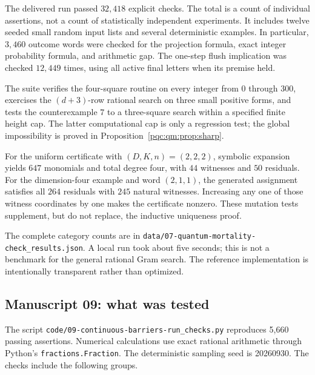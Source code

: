 \documentclass[11pt,letterpaper]{article}
\numberwithin{equation}{section}
\theoremstyle{definition}
\theoremstyle{remark}
\newcommand{\code}[1]{\nolinkurl{#1}}
\begin{document}
The delivered run passed $32{,}418$ explicit checks. The total is a count of individual assertions, not a count of statistically independent experiments. It includes twelve seeded small random input lists and several deterministic examples. In particular, $3{,}460$ outcome words were checked for the projection formula, exact integer probability formula, and arithmetic gap. The one-step flush implication was checked $12{,}449$ times, using all active final letters when its premise held.

The suite verifies the four-square routine on every integer from $0$ through $300$, exercises the $(d+3)$-row rational search on three small positive forms, and tests the counterexample $7$ to a three-square search within a specified finite height cap. The latter computational cap is only a regression test; the global impossibility is proved in Proposition~\ref{pqc:qm:prop:sharp}.

For the uniform certificate with $(D,K,n)=(2,2,2)$, symbolic expansion yields $647$ monomials and total degree four, with $44$ witnesses and $50$ residuals. For the dimension-four example and word $(2,1,1)$, the generated assignment satisfies all $264$ residuals with $245$ natural witnesses. Increasing any one of those witness coordinates by one makes the certificate nonzero. These mutation tests supplement, but do not replace, the inductive uniqueness proof.

The complete category counts are in \code{data/07-quantum-mortality-check_results.json}. A local run took about five seconds; this is not a benchmark for the general rational Gram search. The reference implementation is intentionally transparent rather than optimized.

\subsection{Manuscript 09: what was tested}

The script \code{code/09-continuous-barriers-run_checks.py} reproduces 5,660 passing assertions.
Numerical calculations use exact rational arithmetic through Python's
\code{fractions.Fraction}.  The deterministic sampling seed is 20260930.  The checks include the following groups.
\end{document}
